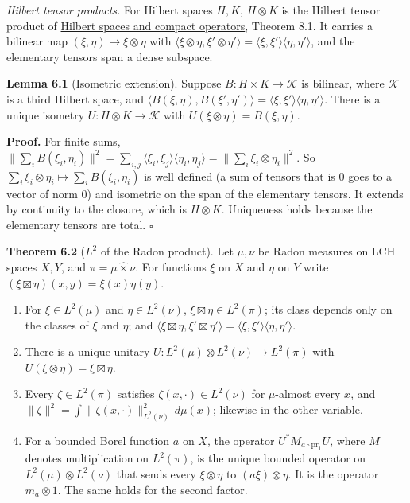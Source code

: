 \documentclass[
  english,
  11pt,
  a4paper,
]{article}
\providecommand{\tightlist}{%
  \setlength{\itemsep}{0pt}\setlength{\parskip}{0pt}}
\begin{document}
\emph{Hilbert tensor products.} For Hilbert spaces \(H,K\),
\(H\otimes K\) is the Hilbert tensor product of
\hyperref[hilbert-spaces-and-compact-operators]{Hilbert spaces and
compact operators}, Theorem 8.1. It carries a bilinear map
\((\xi,\eta)\mapsto\xi\otimes\eta\) with
\(\langle\xi\otimes\eta,\xi'\otimes\eta'\rangle=\langle\xi,\xi'\rangle\langle\eta,\eta'\rangle\),
and the elementary tensors span a dense subspace.

\textbf{Lemma 6.1} (Isometric extension). Suppose
\(B\colon H\times K\to\mathcal K\) is bilinear, where \(\mathcal K\) is
a third Hilbert space, and
\(\langle B(\xi,\eta),B(\xi',\eta')\rangle=\langle\xi,\xi'\rangle\langle\eta,\eta'\rangle\).
There is a unique isometry \(U\colon H\otimes K\to\mathcal K\) with
\(U(\xi\otimes\eta)=B(\xi,\eta)\).

\textbf{Proof.} For finite sums,
\(\|\sum_iB(\xi_i,\eta_i)\|^2=\sum_{i,j}\langle\xi_i,\xi_j\rangle\langle\eta_i,\eta_j\rangle=\|\sum_i\xi_i\otimes\eta_i\|^2\).
So \(\sum_i\xi_i\otimes\eta_i\mapsto\sum_iB(\xi_i,\eta_i)\) is well
defined (a sum of tensors that is \(0\) goes to a vector of norm \(0\))
and isometric on the span of the elementary tensors. It extends by
continuity to the closure, which is \(H\otimes K\). Uniqueness holds
because the elementary tensors are total. \(\square\)

\textbf{Theorem 6.2} (\(L^2\) of the Radon product). Let \(\mu,\nu\) be
Radon measures on LCH spaces \(X,Y\), and \(\pi=\mu\hat\times\nu\). For
functions \(\xi\) on \(X\) and \(\eta\) on \(Y\) write
\((\xi\boxtimes\eta)(x,y)=\xi(x)\eta(y)\).

\begin{enumerate}
\tightlist
\item
  For \(\xi\in L^2(\mu)\) and \(\eta\in L^2(\nu)\),
  \(\xi\boxtimes\eta\in L^2(\pi)\); its class depends only on the
  classes of \(\xi\) and \(\eta\); and
  \(\langle\xi\boxtimes\eta,\xi'\boxtimes\eta'\rangle=\langle\xi,\xi'\rangle\langle\eta,\eta'\rangle\).
\item
  There is a unique unitary
  \(U\colon L^2(\mu)\otimes L^2(\nu)\to L^2(\pi)\) with
  \(U(\xi\otimes\eta)=\xi\boxtimes\eta\).
\item
  Every \(\zeta\in L^2(\pi)\) satisfies \(\zeta(x,\cdot)\in L^2(\nu)\)
  for \(\mu\)-almost every \(x\), and
  \(\|\zeta\|^2=\int\|\zeta(x,\cdot)\|_{L^2(\nu)}^2\,d\mu(x)\); likewise
  in the other variable.
\item
  For a bounded Borel function \(a\) on \(X\), the operator
  \(U^*M_{a\circ\mathrm{pr}_1}U\), where \(M\) denotes multiplication on
  \(L^2(\pi)\), is the unique bounded operator on
  \(L^2(\mu)\otimes L^2(\nu)\) that sends every \(\xi\otimes\eta\) to
  \((a\xi)\otimes\eta\). It is the operator \(m_a\otimes1\). The same
  holds for the second factor.
\end{enumerate}
\end{document}
